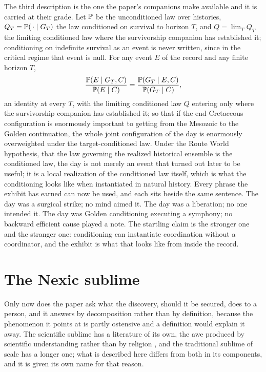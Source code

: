 The third description is the one the paper's companions make available
and it is carried at their grade. Let $\mathbb{P}$ be the unconditioned law
over histories, $Q_T=\mathbb{P}(\,\cdot\mid G_T)$ the law conditioned on
survival to horizon $T$, and $Q=\lim_TQ_T$ the limiting conditioned law
where the survivorship companion has established it; conditioning on
indefinite survival as an event is never written, since in the critical
regime that event is null. For any event $E$ of the record and any finite horizon $T$,
\[
\frac{\mathbb{P}(E\mid G_T,C)}{\mathbb{P}(E\mid C)}=\frac{\mathbb{P}(G_T\mid E,C)}{\mathbb{P}(G_T\mid C)},
\]
an identity at every $T$, with the limiting conditioned law $Q$ entering
only where the survivorship companion has established it; so that if the end-Cretaceous configuration is enormously important to
getting from the Mesozoic to the Golden continuation, the whole joint
configuration of the day is enormously overweighted under the
target-conditioned law. Under the Route World hypothesis, that the law
governing the realized historical ensemble is the conditioned law, the
day is not merely an event that turned out later to be useful; it is a
local realization of the conditioned law itself, which is what the
conditioning looks like when instantiated in natural history. Every
phrase the exhibit has earned can now be used, and each sits beside the
same sentence. The day was a surgical strike; no mind aimed it. The day
was a liberation; no one intended it. The day was Golden conditioning
executing a symphony; no backward efficient cause played a note. The
startling claim is the stronger one and the stranger one: conditioning
can instantiate coordination without a coordinator, and the exhibit is
what that looks like from inside the record.

\section{The Nexic sublime}\label{sec:sublime}

Only now does the paper ask what the discovery, should it be secured, does to a person, and it
answers by decomposition rather than by definition, because the
phenomenon it points at is partly ostensive and a definition would
explain it away. The scientific sublime has a literature of its own,
the awe produced by scientific understanding rather than by religion
\cite{Gross18}, and the traditional sublime of scale has a longer one;
what is described here differs from both in its components, and it is
given its own name for that reason.

